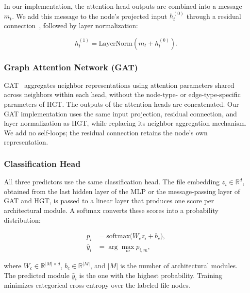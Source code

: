 In our implementation, the attention-head outputs are combined into a message $m_t$. We add this message to the node's projected input $h_t^{(0)}$ through a residual connection~\cite{residual_connection}, followed by layer normalization:

\begin{equation}
h_t^{(1)} = \mathrm{LayerNorm}\left(m_t + h_t^{(0)}\right).
\end{equation}

\subsubsection{Graph Attention Network (GAT)\label{sec:gat_model}}

GAT~\cite{gat} aggregates neighbor representations using attention parameters shared across neighbors within each head, without the node-type- or edge-type-specific parameters of HGT. The outputs of the attention heads are concatenated. Our GAT implementation uses the same input projection, residual connection, and layer normalization as HGT, while replacing its neighbor aggregation mechanism. We add no self-loops; the residual connection retains the node's own representation.

\subsubsection{Classification Head\label{sec:head}}

All three predictors use the same classification head. The file embedding $z_i \in \mathbb{R}^{d}$, obtained from the last hidden layer of the MLP or the message-passing layer of GAT and HGT, is passed to a linear layer that produces one score per architectural module. A softmax converts these scores into a probability distribution:

\begin{equation}
\label{eq:head}
\begin{aligned}
p_i &= \text{softmax}\big(W_c z_i + b_c\big), \\
\hat{y}_i &= \arg\max_m p_{i,m},
\end{aligned}
\end{equation}

where $W_c \in \mathbb{R}^{|M| \times d}$, $b_c \in \mathbb{R}^{|M|}$, and $|M|$ is the number of architectural modules. The predicted module $\hat{y}_i$ is the one with the highest probability. Training minimizes categorical cross-entropy over the labeled file nodes.
